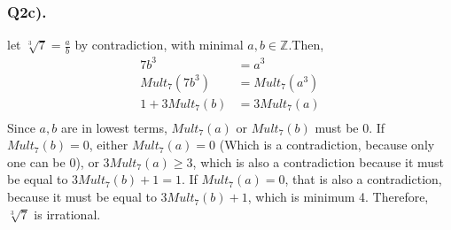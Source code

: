 \documentclass{article}
\begin{document}
\subsubsection*{Q2c).}
let $\sqrt[3]{7} = \frac{a}{b}$ by contradiction, with minimal $a, b \in \mathbb{Z}$.Then,\\
\begin{align*}
7b^{3} &= a^{3}\\
Mult_{7}(7b^{3}) &= Mult_{7}(a^{3})\\
1 + 3Mult_{7}(b) &= 3Mult_{7}(a)\\
\end{align*} 
Since $a, b$ are in lowest terms, $Mult_{7}(a)$ or $Mult_{7}(b)$ must be 0. If $Mult_{7}(b) = 0$, either $Mult_{7}(a) = 0$ (Which is a contradiction, because only one can be 0), or $3Mult_{7}(a) \geq 3$, which is also a contradiction because it must be equal to $3Mult_{7}(b) + 1 = 1$. If $Mult_{7}(a) = 0$, that is also a contradiction, because it must be equal to  $3Mult_{7}(b) + 1$, which is minimum 4. Therefore,  $\sqrt[3]{7}$ is irrational.
\end{document}
